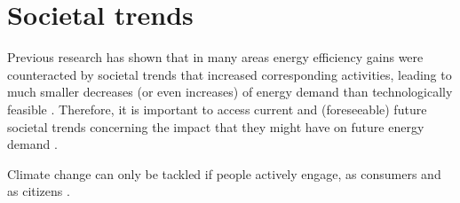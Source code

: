 \section{Societal trends}

Previous research has shown that in many areas energy efficiency gains were counteracted by societal trends that increased corresponding activities, leading to much smaller decreases (or even increases) of energy demand than technologically feasible \cite{2050}. 
Therefore, 
it is important to access current and (foreseeable) future societal trends concerning the impact that they might have on future energy demand \cite{2050}.

Climate change can only be tackled if people actively engage, as consumers and as citizens \cite{clean}. 